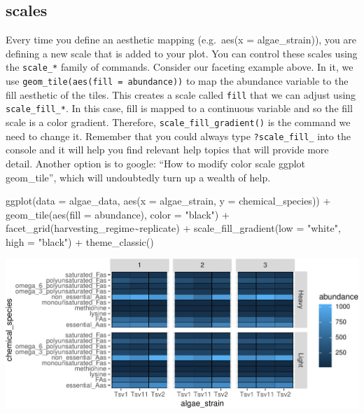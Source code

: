 \documentclass[
]{krantz}
\newenvironment{Shaded}{\begin{snugshade}}{\end{snugshade}}
\newcommand{\AttributeTok}[1]{\textcolor[rgb]{0.77,0.63,0.00}{#1}}
\newcommand{\FunctionTok}[1]{\textcolor[rgb]{0.00,0.00,0.00}{#1}}
\newcommand{\NormalTok}[1]{#1}
\newcommand{\SpecialCharTok}[1]{\textcolor[rgb]{0.00,0.00,0.00}{#1}}
\newcommand{\StringTok}[1]{\textcolor[rgb]{0.31,0.60,0.02}{#1}}
\begin{document}
\hypertarget{scales}{%
\subsection{scales}\label{scales}}

Every time you define an aesthetic mapping (e.g.~aes(x = algae\_strain)), you are defining a new scale that is added to your plot. You can control these scales using the \texttt{scale\_*} family of commands. Consider our faceting example above. In it, we use \texttt{geom\_tile(aes(fill\ =\ abundance))} to map the abundance variable to the fill aesthetic of the tiles. This creates a scale called \texttt{fill} that we can adjust using \texttt{scale\_fill\_*}. In this case, fill is mapped to a continuous variable and so the fill scale is a color gradient. Therefore, \texttt{scale\_fill\_gradient()} is the command we need to change it. Remember that you could always type \texttt{?scale\_fill\_} into the console and it will help you find relevant help topics that will provide more detail. Another option is to google: ``How to modify color scale ggplot geom\_tile'', which will undoubtedly turn up a wealth of help.

\begin{Shaded}
\begin{Highlighting}[]
\FunctionTok{ggplot}\NormalTok{(}\AttributeTok{data =}\NormalTok{ algae\_data, }\FunctionTok{aes}\NormalTok{(}\AttributeTok{x =}\NormalTok{ algae\_strain, }\AttributeTok{y =}\NormalTok{ chemical\_species)) }\SpecialCharTok{+} 
  \FunctionTok{geom\_tile}\NormalTok{(}\FunctionTok{aes}\NormalTok{(}\AttributeTok{fill =}\NormalTok{ abundance), }\AttributeTok{color =} \StringTok{"black"}\NormalTok{) }\SpecialCharTok{+} 
  \FunctionTok{facet\_grid}\NormalTok{(harvesting\_regime}\SpecialCharTok{\textasciitilde{}}\NormalTok{replicate) }\SpecialCharTok{+}
  \FunctionTok{scale\_fill\_gradient}\NormalTok{(}\AttributeTok{low =} \StringTok{"white"}\NormalTok{, }\AttributeTok{high =} \StringTok{"black"}\NormalTok{) }\SpecialCharTok{+}
  \FunctionTok{theme\_classic}\NormalTok{()}
\end{Highlighting}
\end{Shaded}

\begin{center}\includegraphics{index_files/figure-latex/unnamed-chunk-59-1} \end{center}
\end{document}
